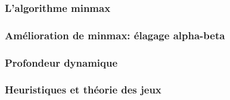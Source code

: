 \subsubsection{L'algorithme minmax}

\subsubsection{Amélioration de minmax: élagage alpha-beta}

\subsubsection{Profondeur dynamique}

\subsubsection{Heuristiques et théorie des jeux}